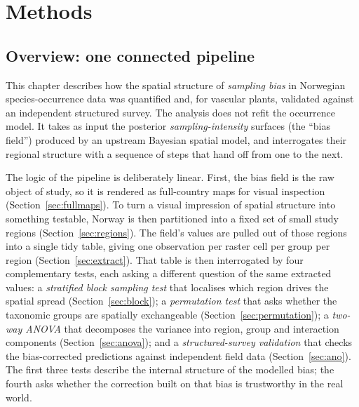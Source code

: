 %
%

\chapter{Methods}
\label{ch:methods}

\section{Overview: one connected pipeline}
\label{sec:overview}

This chapter describes how the spatial structure of \emph{sampling bias}
in Norwegian species-occurrence data was quantified and, for vascular
plants, validated against an independent structured survey. The analysis
does not refit the occurrence model. It takes as input the posterior
\emph{sampling-intensity} surfaces (the ``bias field'') produced by an
upstream Bayesian spatial model, and interrogates their regional
structure with a sequence of steps that hand off from one to the next.

The logic of the pipeline is deliberately linear. First, the bias field
is the raw object of study, so it is rendered as full-country maps for
visual inspection (Section~\ref{sec:fullmaps}). To turn a visual
impression of spatial structure into something testable, Norway is then
partitioned into a fixed set of small study regions
(Section~\ref{sec:regions}). The field's values are pulled out of those
regions into a single tidy table, giving one observation per raster cell
per group per region (Section~\ref{sec:extract}). That table is then
interrogated by four complementary tests, each asking a different
question of the same extracted values: a \emph{stratified block sampling
test} that localises which region drives the spatial spread
(Section~\ref{sec:block}); a \emph{permutation test} that asks whether
the taxonomic groups are spatially exchangeable
(Section~\ref{sec:permutation}); a \emph{two-way ANOVA} that decomposes
the variance into region, group and interaction components
(Section~\ref{sec:anova}); and a \emph{structured-survey validation} that
checks the bias-corrected predictions against independent field data
(Section~\ref{sec:ano}). The first three tests describe the internal
structure of the modelled bias; the fourth asks whether the correction
built on that bias is trustworthy in the real world.

